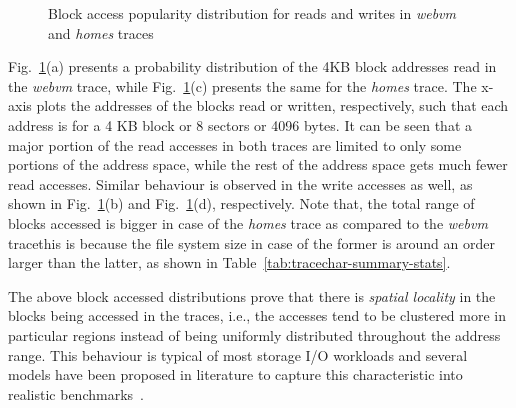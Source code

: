 \begin{figure}[t]
    \hfill
    \caption{Block access popularity distribution for reads and writes in
    \textit{webvm} and \textit{homes} traces}
    \label{fig:webvm-blocks-read-write-distrib}
\end{figure}

Fig.~\ref{fig:webvm-blocks-read-write-distrib}(a) presents a probability distribution
of the 4KB block addresses read in the \textit{webvm} trace,
while Fig.~\ref{fig:webvm-blocks-read-write-distrib}(c) presents the same
for the \textit{homes} trace. The x-axis plots the addresses of the blocks
read or written, respectively, such that each address is for a 4 KB block
or 8 sectors or 4096 bytes.
It can be seen that a major portion of
the read accesses in both traces are limited to only some portions of the address space,
while the rest of the address space gets much fewer read accesses.
Similar behaviour is observed in the write accesses as well, as shown
in Fig.~\ref{fig:webvm-blocks-read-write-distrib}(b)
and Fig.~\ref{fig:webvm-blocks-read-write-distrib}(d), respectively.
Note that, the total range of blocks accessed is bigger in case of
the \textit{homes} trace as compared to the \textit{webvm} trace\textemdash{}this is
because the file system size in case of the former is around an order
larger than the latter, as shown in
Table~\ref{tab:tracechar-summary-stats}.

The above block accessed distributions prove that there is \textit{spatial locality} in
the blocks being accessed in the traces, i.e., the accesses tend to be clustered more
in particular regions instead of being uniformly distributed throughout the address
range. This behaviour is typical of most storage I/O workloads and several
models have been proposed in literature to capture this characteristic
into realistic benchmarks~\cite{jump-based-synthetic, storagecharacterization}.

